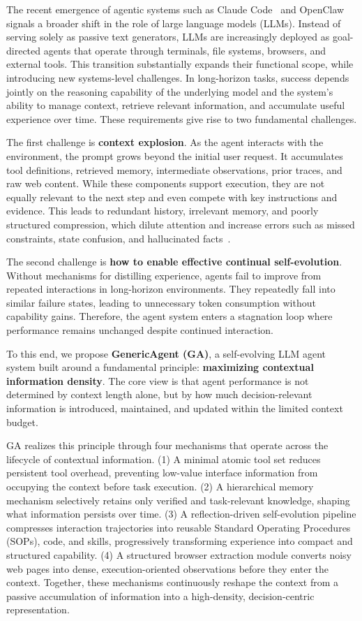 The recent emergence of agentic systems such as Claude Code~\citep{claudecode} and OpenClaw~\citep{openclaw_rl} signals a broader shift in the role of large language models (LLMs).
Instead of serving solely as passive text generators, LLMs are increasingly deployed as goal-directed agents that operate through terminals, file systems, browsers, and external tools.
This transition substantially expands their functional scope, while introducing new systems-level challenges.
In long-horizon tasks, success depends jointly on the reasoning capability of the underlying model and the system’s ability to manage context, retrieve relevant information, and accumulate useful experience over time.
These requirements give rise to two fundamental challenges.


The first challenge is \textbf{context explosion}. 
As the agent interacts with the environment, the prompt grows beyond the initial user request. 
It accumulates tool definitions, retrieved memory, intermediate observations, prior traces, and raw web content. 
While these components support execution, they are not equally relevant to the next step and even compete with key instructions and evidence. 
This leads to redundant history, irrelevant memory, and poorly structured compression, which dilute attention and increase errors such as missed constraints, state confusion, and hallucinated facts~\cite{lost_in_middle,multi_turn_lost,anthropic_context}.

The second challenge is \textbf{how to enable effective continual self-evolution}.
Without mechanisms for distilling experience, agents fail to improve from repeated interactions in long-horizon environments.
They repeatedly fall into similar failure states, leading to unnecessary token consumption without capability gains.
Therefore, the agent system enters a stagnation loop where performance remains unchanged despite continued interaction.

To this end, we propose \textbf{GenericAgent (GA)}, a self-evolving LLM agent system built around a fundamental principle: \textbf{maximizing contextual information density}. 
The core view is that agent performance is not determined by context length alone, but by how much decision-relevant information is introduced, maintained, and updated within the limited context budget.

GA realizes this principle through four mechanisms that operate across the lifecycle of contextual information. 
(1) A minimal atomic tool set reduces persistent tool overhead, preventing low-value interface information from occupying the context before task execution. 
(2) A hierarchical memory mechanism selectively retains only verified and task-relevant knowledge, shaping what information persists over time. 
(3) A reflection-driven self-evolution pipeline compresses interaction trajectories into reusable Standard Operating Procedures (SOPs), code, and skills, progressively transforming experience into compact and structured capability. 
(4) A structured browser extraction module converts noisy web pages into dense, execution-oriented observations before they enter the context. 
Together, these mechanisms continuously reshape the context from a passive accumulation of information into a high-density, decision-centric representation. 

